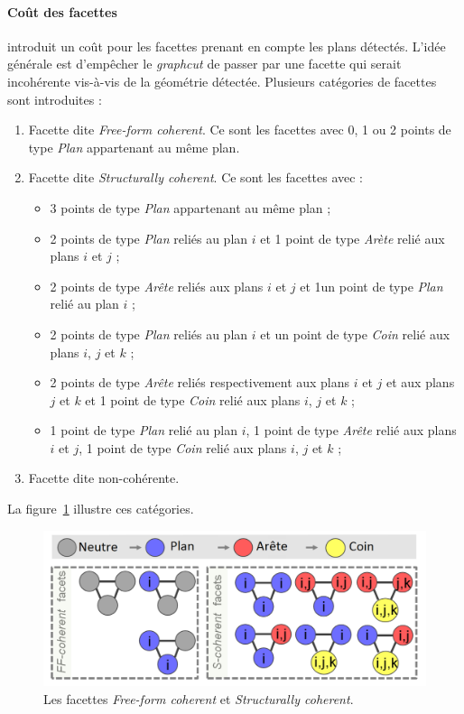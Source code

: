 \documentclass[12pt, twoside]{article}
\begin{document}
\paragraph{Coût des facettes} \cite{maillage2} introduit un coût pour les facettes prenant en compte les plans détectés. L'idée générale est d'empêcher le \textit{graphcut} de passer par une facette qui serait incohérente vis-à-vis de la géométrie détectée. Plusieurs catégories de facettes sont introduites :
\begin{enumerate}
  \item Facette dite \textit{Free-form coherent}. Ce sont les facettes avec 0, 1 ou 2 points de type \textit{Plan} appartenant au même plan.
  \item Facette dite \textit{Structurally coherent}. Ce sont les facettes avec :
  \begin{itemize}
    \item 3 points de type \textit{Plan} appartenant au même plan ;
    \item 2 points de type \textit{Plan} reliés au plan $i$ et 1 point de type \textit{Arète} relié aux plans $i$ et $j$ ;
    \item 2 points de type \textit{Arête} reliés aux plans $i$ et $j$ et 1un point de type \textit{Plan} relié au plan $i$ ;
    \item 2 points de type \textit{Plan} reliés au plan $i$ et un point de type \textit{Coin} relié aux plans $i$, $j$ et $k$ ;
    \item 2 points de type \textit{Arête} reliés respectivement aux plans $i$ et $j$ et aux plans $j$ et $k$ et 1 point de type \textit{Coin} relié aux plans $i$, $j$ et $k$ ;
    \item 1 point de type \textit{Plan} relié au plan $i$, 1 point de type \textit{Arête} relié aux plans $i$ et $j$, 1 point de type \textit{Coin} relié aux plans $i$, $j$ et $k$ ;
  \end{itemize}
  \item Facette dite non-cohérente.
\end{enumerate}

La figure~\ref{fig:coherence} illustre ces catégories.

\begin{figure}[h]
\centering
\includegraphics[scale=0.4]{coherent.png}
\caption{\label{fig:coherence} Les facettes \textit{Free-form coherent} et \textit{Structurally coherent}.}
\end{figure}
\end{document}
